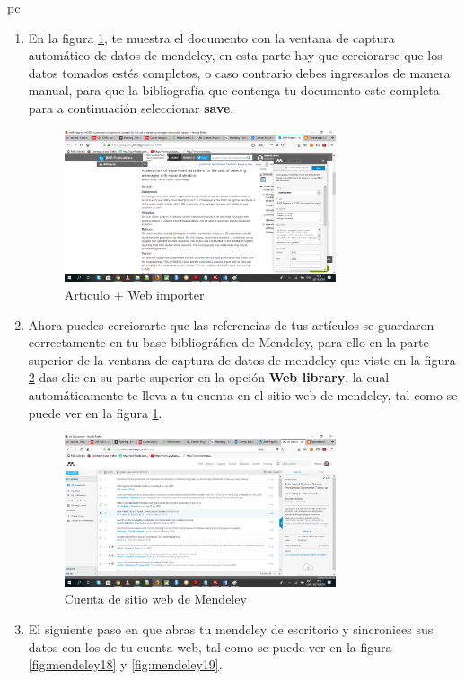 pc\documentclass[a4paper,12pt,openany]{book}
\begin{document}
\begin{itemize}
\begin{enumerate}
    \item En la figura \ref{fig:mendeley16}, te muestra el documento con la ventana de captura automático de datos de mendeley, en esta parte hay que cerciorarse que los datos tomados estés completos, o caso contrario debes ingresarlos de manera manual, para que la bibliografía que contenga tu documento este completa para a continuación seleccionar \textbf{save}.
    
    \begin{figure}[H]
    \centering
	\includegraphics[width=8cm]{mendeley15.png}
    \caption{Articulo + Web importer}
    \label{fig:mendeley16}
    \end{figure}

    \item Ahora puedes cerciorarte que las referencias de tus artículos se guardaron correctamente en tu base bibliográfica de Mendeley, para ello en la parte superior de la ventana de captura de datos de mendeley que viste en la figura \ref{fig:mendeley17} das clic en su parte superior en la opción \textbf{Web library}, la cual automáticamente te lleva a tu cuenta en el sitio web de mendeley, tal como se puede ver en la figura \ref{fig:mendeley16}.
    
    \begin{figure}[H]
    \centering
	\includegraphics[width=8cm]{mendeley16.png}
    \caption{Cuenta de sitio web de Mendeley}
    \label{fig:mendeley17}
    \end{figure}
    
    \item El siguiente paso en que abras tu mendeley de escritorio y sincronices sus datos con los de tu cuenta web, tal como se puede ver en la figura \ref{fig:mendeley18} y \ref{fig:mendeley19}.
    

\end{enumerate}
\end{itemize}
\end{document}
